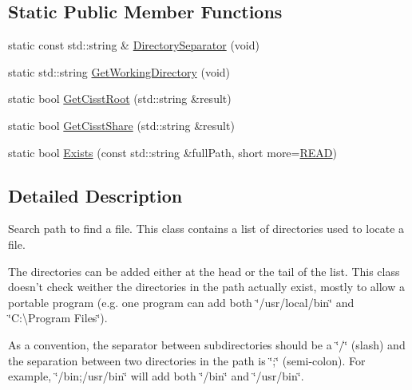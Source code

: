 \subsection*{Static Public Member Functions}
\begin{DoxyCompactItemize}
\item 
static const std\-::string \& \hyperlink{classcmn_path_abe1c6a1601b0e8bfb17001c96dc15c4f}{Directory\-Separator} (void)
\item 
static std\-::string \hyperlink{classcmn_path_a713c763f4435a4f584d827a457ca66d9}{Get\-Working\-Directory} (void)
\item 
static bool \hyperlink{classcmn_path_af7a1de336b73417f478648eb8d9b103c}{Get\-Cisst\-Root} (std\-::string \&result)
\item 
static bool \hyperlink{classcmn_path_a5a8c437511b2257ff31eeb7fce0c7b61}{Get\-Cisst\-Share} (std\-::string \&result)
\item 
static bool \hyperlink{classcmn_path_adf86564a090b5e585d749d233e25424b}{Exists} (const std\-::string \&full\-Path, short more=\hyperlink{classcmn_path_a15dacf9562d80d5b7eb9b849726e768caea0bb09a4a02da90f6c172531cd17a05}{R\-E\-A\-D})
\end{DoxyCompactItemize}


\subsection{Detailed Description}
Search path to find a file. This class contains a list of directories used to locate a file. 

The directories can be added either at the head or the tail of the list. This class doesn't check weither the directories in the path actually exist, mostly to allow a portable program (e.\-g. one program can add both \char`\"{}/usr/local/bin\char`\"{} and \char`\"{}\-C\-:\textbackslash{}\-Program Files\char`\"{}).

As a convention, the separator between subdirectories should be a \char`\"{}/\char`\"{} (slash) and the separation between two directories in the path is \char`\"{};\char`\"{} (semi-\/colon). For example, \char`\"{}/bin;/usr/bin\char`\"{} will add both \char`\"{}/bin\char`\"{} and \char`\"{}/usr/bin\char`\"{}. 

